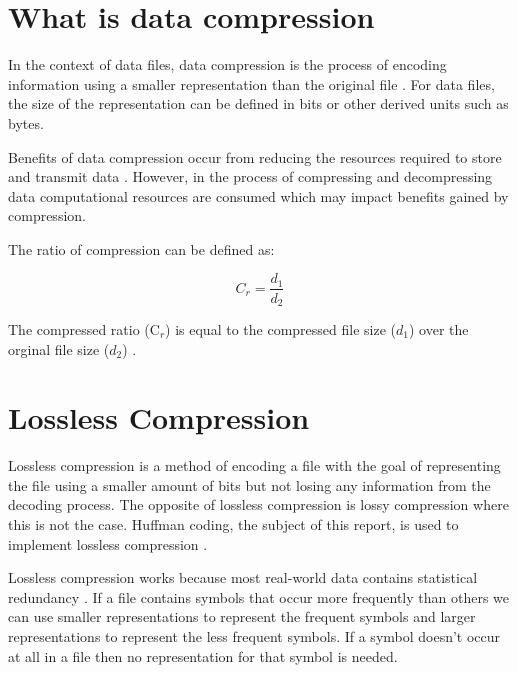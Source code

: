 

\section{What is data compression}


\singlespacing
In the context of data files, data compression is the process of encoding information using a smaller representation than the original file \cite{WikiDataCompression}. For data files, the size of the representation can be defined in bits or other derived units such as bytes.


\doublespacing
\singlespacing
Benefits of data compression occur from reducing the resources required to store and transmit data \cite{WikiDataCompression}. However, in the process of compressing and decompressing data computational resources are consumed which may impact benefits gained by compression.


\doublespacing
\singlespacing
The ratio of compression can be defined as:


\begin{equation*}
  C_{r} = \dfrac{d_{1}}{d_{2}}
\end{equation*}


\doublespacing
\singlespacing
The compressed ratio (C$_{r}$) is equal to the compressed file size ($d_{1}$) over the orginal file size ($d_{2}$) \cite{MasseyStudyGuide}.


\doublespacing
\singlespacing
\section{Lossless Compression}


\singlespacing


Lossless compression is a method of encoding a file with the goal of representing the file using a smaller amount of bits but not losing any information from the decoding process. The opposite of lossless compression is lossy compression where this is not the case. Huffman coding, the subject of this report, is used to implement lossless compression \cite{WikiHuffman}.


\doublespacing
\singlespacing
Lossless compression works because most real-world data contains statistical redundancy \cite{WikiDataCompression}. If a file contains symbols that occur more frequently than others we can use smaller representations to represent the frequent symbols and larger representations to represent the less frequent symbols. If a symbol doesn't occur at all in a file then no representation for that symbol is needed.


